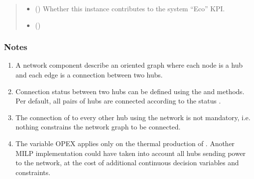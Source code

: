 \documentclass[letterpaper,10pt,english]{sphinxmanual}
\begin{document}
\begin{fulllineitems}
\begin{fulllineitems}
\begin{quote}
\begin{description}
\begin{itemize}
\item {} 
\sphinxAtStartPar
{} (\sphinxstyleliteralemphasis{\sphinxupquote{, }}\sphinxstyleliteralemphasis{\sphinxupquote{, }}) \textendash{} Whether this instance contributes to the system “Eco” KPI.

\item {} 
\sphinxAtStartPar
{} (\sphinxstyleliteralemphasis{\sphinxupquote{, }}) \textendash{} 

\end{itemize}

\end{description}\end{quote}
\subsubsection*{Notes}
\begin{enumerate}
%
\item {} 
\sphinxAtStartPar
A network component describe an oriented graph where each node is a hub and each edge is a connection between two hubs.

\item {} 
\sphinxAtStartPar
Connection status between two hubs can be defined using the  and  methods.
Per default, all pairs of hubs are connected according to the status .

\item {} 
\sphinxAtStartPar
The connection of  to every other hub using the network is not mandatory,
i.e. nothing constrains the network graph to be connected.

\item {} 
\sphinxAtStartPar
The variable OPEX applies only on the thermal production of .
Another MILP implementation could have taken into account all hubs sending power to the network, at the cost of
additional continuous decision variables and constraints.

\end{enumerate}


\end{fulllineitems}
\end{fulllineitems}
\end{document}

